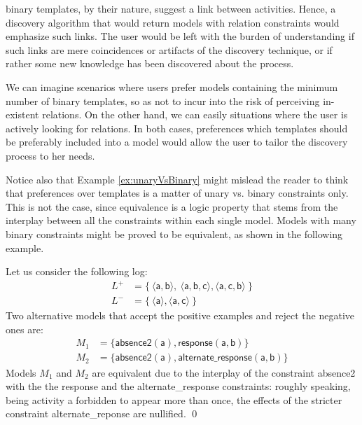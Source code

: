 \declare binary templates, by their nature, suggest a link between activities. Hence, a discovery algorithm that would return models with relation constraints would emphasize such links. The user would be left with the burden of understanding if such links are mere coincidences or artifacts of the discovery technique, or if rather some new knowledge has been discovered about the process.

We can imagine scenarios where users prefer models containing the minimum number of binary templates, so as not to incur into the risk of perceiving in-existent relations. On the other hand, we can easily  %
 situations where the user is actively looking for %
 relations. In both cases, preferences  
 which \btext{\declare} templates should be preferably included into a model would allow the user to tailor the discovery process to her needs.

Notice also that Example \ref{ex:unaryVsBinary} might mislead the reader to think that preferences over templates is a matter of unary vs. binary constraints only. This is not the case, since equivalence is a logic property that stems from the interplay between all the constraints within each single model. Models with many binary constraints might be proved to be equivalent, as shown in the following example.

\begin{example}
\label{ex:alternateVsResponseEquiv}
Let us consider the following log:
\begin{align*}
L^+& = \{\ \langle \mathsf{a}, \mathsf{b} \rangle,\ \langle \mathsf{a}, \mathsf{b}, \mathsf{c} \rangle, \langle \mathsf{a}, \mathsf{c}, \mathsf{b} \rangle\ \} \\
L^-& = \{\ \langle \mathsf{a} \rangle, \langle \mathsf{a}, \mathsf{c} \rangle \ \}
\end{align*}
%
Two alternative models that accept the positive examples and reject the negative ones are:
\begin{align*}
M_1 & = \{ \mathsf{absence2(a),response(a,b)}\} \\
M_2 & = \{ \mathsf{absence2(a),alternate\_response(a, b)}\}
\end{align*}
Models $M_1$ and $M_2$  %
are equivalent due to the interplay of the constraint \textsf{absence2} with the the \textsf{response} and the \textsf{alternate\_response} constraints: roughly speaking, being activity \textsf{a} forbidden to appear more than once, the effects of the stricter constraint \textsf{alternate\_reponse} are nullified.
\qed
\end{example}




